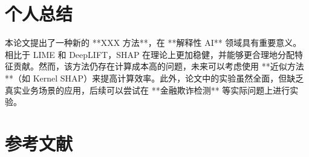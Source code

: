 \documentclass[a4paper,12pt]{article}
\begin{document}
\section{个人总结}
本论文提出了一种新的 **XXX 方法**，在 **解释性 AI** 领域具有重要意义。相比于 LIME 和 DeepLIFT，SHAP 在理论上更加稳健，并能够更合理地分配特征贡献。然而，该方法仍存在计算成本高的问题，未来可以考虑使用 **近似方法**（如 Kernel SHAP）来提高计算效率。此外，论文中的实验虽然全面，但缺乏真实业务场景的应用，后续可以尝试在 **金融欺诈检测** 等实际问题上进行实验。

\section{参考文献}
\begin{thebibliography}{99}

\end{thebibliography}
\end{document}
